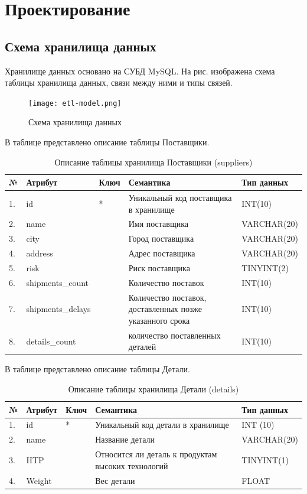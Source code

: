 \section{Проектирование}
\subsection{Схема хранилища данных}
Хранилище данных основано на СУБД MySQL. На рис.  изображена схема таблицы хранилища данных, связи между ними и типы связей.

\begin{figure}[h]
  \centering
  \texttt{[image: etl-model.png]}
  \caption{Схема хранилища данных}
  \label{etl-diagram}
\end{figure}

В таблице  представлено описание таблицы Поставщики.
\begin{table}[h]
	\caption{\space Описание таблицы хранилища Поставщики (suppliers)}
	\label{etl-suppliers}
	\begin{tabular}{|p{0.4cm}|p{2.5cm}|p{1.5cm}|p{6.3cm}|p{3.2cm}|}
		\hline
		\textbf{№} & \textbf{Атрибут} & \textbf{Ключ} & \textbf{Семантика} & \textbf{Тип данных} \\
		\hline
		1. & id & * & Уникальный код поставщика в хранилище & INT(10) \\
		\hline
		2. & name & & Имя поставщика & VARCHAR(20) \\
		\hline
		3. & city & & Город поставщика & VARCHAR(20) \\
		\hline
		4. & address & & Адрес поставщика & VARCHAR(20) \\
		\hline
		5. & risk & & Риск поставщика & TINYINT(2) \\
		\hline
		6. & shipments\_count & & Количество поставок & INT(10) \\
		\hline
		7. & shipments\_delays & & Количество поставок, доставленных позже указанного срока & INT(10) \\
		\hline
		8. & details\_count & & количество поставленных деталей & INT(10) \\
		\hline
	\end{tabular}
\end{table}

В таблице  представлено описание таблицы Детали.
\begin{table}[h]
	\caption{\space Описание таблицы хранилища Детали (details)}
	\label{etl-parts}
	\begin{tabular}{|p{0.4cm}|p{2.5cm}|p{1.5cm}|p{6.3cm}|p{3.2cm}|}
		\hline
		\textbf{№} & \textbf{Атрибут} & \textbf{Ключ} & \textbf{Семантика} & \textbf{Тип данных} \\
		\hline
		1. & id & * & Уникальный код детали в хранилище & INT (10) \\
		\hline
		2. & name & & Название детали & VARCHAR(20) \\
		\hline
		3. & HTP & & Относится ли деталь к продуктам высоких технологий & TINYINT(1) \\
		\hline
		4. & Weight & & Вес детали & FLOAT \\
		\hline
	\end{tabular}
\end{table}

